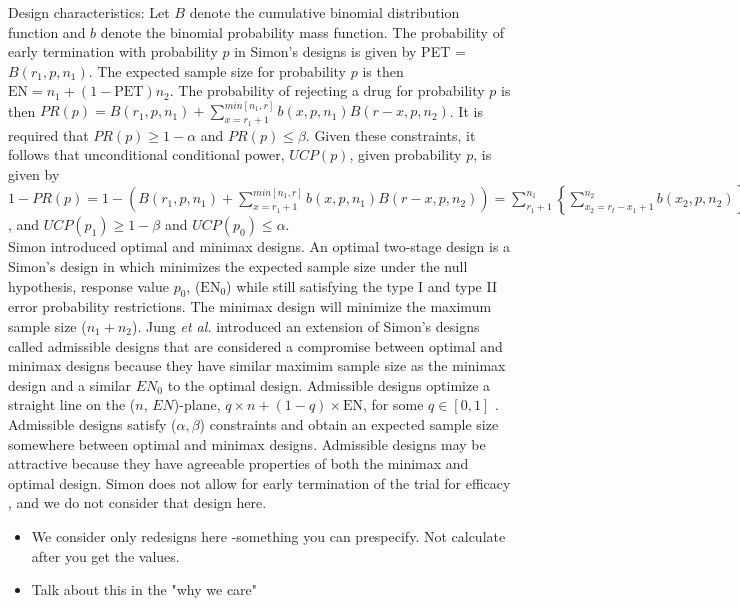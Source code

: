 \documentclass[12pt]{report}\usepackage[]{graphicx}\usepackage[]{color}
\newlength{\li}\setlength{\li}{14.48pt}
\newlength{\di}\setlength{\di}{-3.5mm}
\begin{document}
\indent Design characteristics: Let $B$ denote the cumulative binomial distribution function and $b$ denote the binomial probability mass function. The probability of early termination with probability $p$ in Simon's designs is given by PET = $B(r_1, p, n_1)$. The expected sample size for probability $p$ is then $\mbox{EN} = n_1 + (1-\mbox{PET})n_2$. The probability of rejecting a drug for probability $p$ is then  $PR(p) = B(r_1, p, n_1) + \sum_{x=r_1+1}^{min[n_1,r]} b(x, p, n_1) B(r-x,p,n_2)$. It is required that $PR(p) \geq 1-\alpha$ and $PR(p) \leq \beta$. Given these constraints, it follows that unconditional conditional power, $UCP(p)$, given probability $p$, is given by $1-PR(p) = 1 - \left( B(r_1, p, n_1) + \sum_{x=r_1+1}^{min[n_1,r]} b(x, p, n_1) B(r-x,p,n_2) \right) = \sum_{r_1+1}^{n_1} \left\{\sum_{x_2 = r_t-x_1+1}^{n_2} b(x_2, p, n_2) \right\} b(x_1, p, n_1)$, and $UCP(p_1) \geq 1-\beta$ and $UCP(p_0) \leq \alpha$. \\
\indent Simon introduced optimal and minimax designs. An optimal two-stage design is a Simon's design in which minimizes the expected sample size under the null hypothesis, response value $p_0$, ($\mbox{EN}_0$) while still satisfying the type I and type II error probability restrictions. The minimax design will minimize the maximum sample size ($n_1 + n_2$). Jung \textit{et al.} \cite{Jung} introduced an extension of Simon's designs called admissible designs that are considered a compromise between optimal and minimax designs because they have similar maximim sample size as the minimax design and a similar $EN_0$ to the optimal design.  Admissible designs optimize a straight line on the ($n$, $EN$)-plane, $q \times n + (1-q) \times \mbox{EN}$, for some $q \in [0,1]$ \cite{Jung}. Admissible designs satisfy ($\alpha, \beta$) constraints and obtain an expected sample size somewhere between optimal and minimax designs. Admissible designs may be attractive because they have agreeable properties of both the minimax and optimal design.  Simon does not allow for early termination of the trial for efficacy \cite{Simon}, and we do not consider that design here. 

\begin{itemize}
  \item We consider only redesigns here -something you can prespecify. Not calculate after you get the values. 
  \item Talk about this in the "why we care"
\end{itemize}

\end{document}
